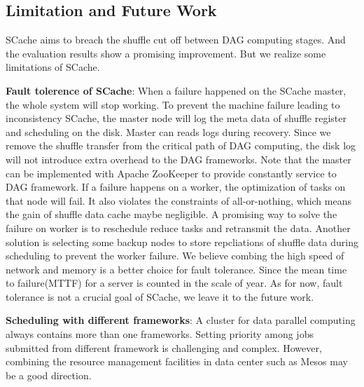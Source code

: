 \subsection{Limitation and Future Work}
SCache aims to breach the shuffle cut off between DAG computing stages. And the evaluation results show a promising improvement. But we realize some limitations of SCache.

\textbf{Fault tolerence of SCache}: When a failure happened on the SCache master, the whole system will stop working. To prevent the machine failure leading to inconsistency SCache, the master node will log the meta data of shuffle register and scheduling on the disk. Master can reads logs during recovery. Since we remove the shuffle transfer from the critical path of DAG computing, the disk log will not introduce extra overhead to the DAG frameworks. Note that the master can be implemented with Apache ZooKeeper\cite{zookeeper} to provide constantly service to DAG framework. If a failure happens on a worker, the optimization of tasks on that node will fail. It also violates the constraints of all-or-nothing, which means the gain of shuffle data cache maybe negligible. A promising way to solve the failure on worker is to reschedule reduce tasks and retransmit the data. Another solution is selecting some backup nodes to store repcliations of shuffle data during scheduling to prevent the worker failure. We believe combing the high speed of network and memory is a better choice for fault tolerance. Since the mean time to failure(MTTF) for a server is counted in the scale of year\cite{tachyon}. As for now, fault tolerance is not a crucial goal of SCache,  we leave it to the future work.  

\textbf{Scheduling with different frameworks}: A cluster for data parallel computing always contains more than one frameworks. Setting priority among jobs submitted from different framework is challenging and complex. However, combining the resource management facilities in data center such as Mesos\cite{mesos} may be a good direction.
